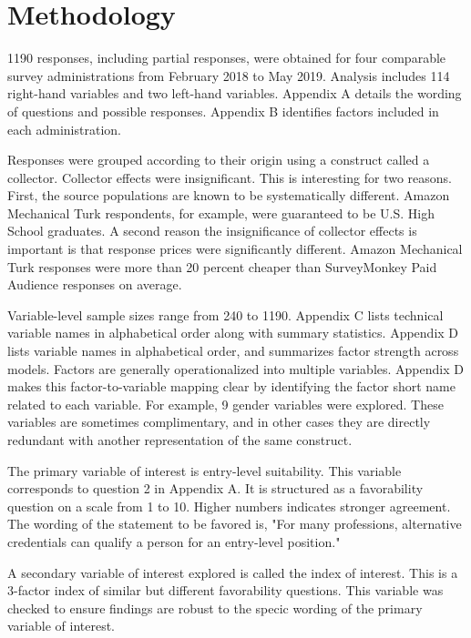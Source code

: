 \documentclass[AER]{./aea-latex-templates/AEA}
\begin{document}
\section{Methodology}

1190 responses, including partial responses, were obtained for four
comparable survey administrations from February 2018 to May 2019.
Analysis includes 114 right-hand variables and two left-hand variables.
Appendix A details the wording of questions and possible responses.
Appendix B identifies factors included in each administration.

Responses were grouped according to their origin using
a construct called a collector. Collector effects
were insignificant. This is interesting for two reasons. First, the source
populations are known to be systematically different. Amazon Mechanical Turk
respondents, for example, were guaranteed to be U.S. High School graduates. A second
reason the insignificance of collector effects is important is that
response prices were significantly different. Amazon Mechanical Turk
responses were more than 20 percent cheaper than SurveyMonkey Paid Audience
responses on average.

Variable-level sample sizes range from 240 to 1190. Appendix C lists
technical variable names in alphabetical order along with summary
statistics. Appendix D lists variable names in alphabetical order, and
summarizes factor strength across models. Factors are generally
operationalized into multiple variables. Appendix D makes this
factor-to-variable mapping clear by identifying the factor short name
related to each variable. For example, 9 gender variables were explored.
These variables are sometimes complimentary, and in other cases they are
directly redundant with another representation of the same construct.

The primary variable of interest is entry-level suitability.
This variable corresponds to question 2 in Appendix A.
It is structured as a favorability question on a scale from 1 to 10. Higher numbers indicates stronger agreement.
The wording of the statement to be favored is, "For many professions, alternative credentials can qualify a person for an entry-level position."

A secondary variable of interest explored is called the index of interest.
This is a 3-factor index of similar but different favorability questions.
This variable was checked to ensure findings are robust to the specic wording of the primary variable of interest.
\end{document}
